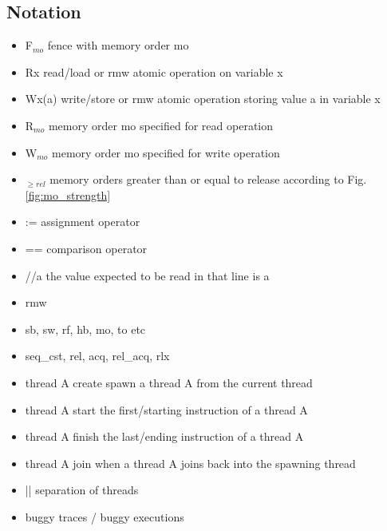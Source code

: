 \subsection{Notation}
\begin{itemize}
	\item F$_{mo}$ \qquad fence with memory order mo
	\item Rx \qquad read/load or rmw atomic operation on variable x
	\item Wx(a) \qquad write/store or rmw atomic operation storing value a in variable x
	\item R$_{mo}$ \qquad memory order mo specified for read operation
	\item W$_{mo}$ \qquad memory order mo specified for write operation
	\item $_{\geq rel}$ \qquad memory orders greater than or equal to release according to Fig. \ref{fig:mo_strength}
	\item := \qquad assignment operator
	\item == \qquad comparison operator
	\item \color{olive}//a \color{black} \qquad the value expected to be read in that line is a
	\item rmw
	\item sb, sw, rf, hb, mo, to \qquad {} etc 
	\item seq\_cst, rel, acq, rel\_acq, rlx
	\item thread A create \qquad spawn a thread A from the current thread
	\item thread A start \qquad the first/starting instruction of a thread A
	\item thread A finish \qquad the last/ending instruction of a thread A
	\item thread A join \qquad when a thread A joins back into the spawning thread
	\item || separation of threads
	\item buggy traces / buggy executions
\end{itemize}